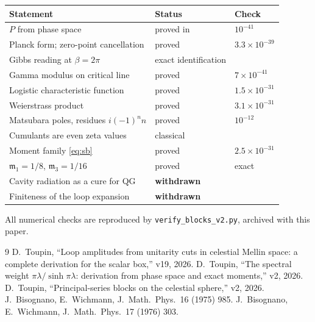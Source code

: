 \documentclass[12pt,a4paper]{article}
\theoremstyle{plain}
\theoremstyle{definition}
\theoremstyle{remark}
\newcommand{\mm}{\mathfrak{m}}
\begin{document}
\begin{center}
\begin{tabular}{lll}
\toprule
Statement & Status & Check \\
\midrule
$P$ from phase space & proved in \cite{ToupinLoops} & $10^{-41}$ \\
Planck form; zero-point cancellation & proved & $3.3\times10^{-39}$ \\
Gibbs reading at $\beta=2\pi$ & exact identification & \\
Gamma modulus on critical line & proved & $7\times10^{-41}$ \\
Logistic characteristic function & proved & $1.5\times10^{-31}$ \\
Weierstrass product & proved & $3.1\times10^{-31}$ \\
Matsubara poles, residues $i(-1)^nn$ & proved & $10^{-12}$ \\
Cumulants are even zeta values & classical & \\
Moment family \eqref{eq:sb} & proved & $2.5\times10^{-31}$ \\
$\mm_1=1/8$, $\mm_3=1/16$ & proved & exact \\
Cavity radiation as a cure for QG & \textbf{withdrawn} & \\
Finiteness of the loop expansion & \textbf{withdrawn} & \\
\bottomrule
\end{tabular}
\end{center}

\noindent
All numerical checks are reproduced by \texttt{verify\_blocks\_v2.py},
archived with this paper.

\begin{thebibliography}{9}
 D.~Toupin, ``Loop amplitudes from unitarity cuts
in celestial Mellin space: a complete derivation for the scalar box,''
v19, 2026.
 D.~Toupin, ``The spectral weight
$\pi\lambda/\sinh\pi\lambda$: derivation from phase space and exact
moments,'' v2, 2026.
 D.~Toupin, ``Principal-series blocks on the
celestial sphere,'' v2, 2026.
 J.~Bisognano, E.~Wichmann, J.\ Math.\ Phys.\ 16 (1975)
985.
 J.~Bisognano, E.~Wichmann, J.\ Math.\ Phys.\ 17 (1976)
303.
\end{thebibliography}
\end{document}

